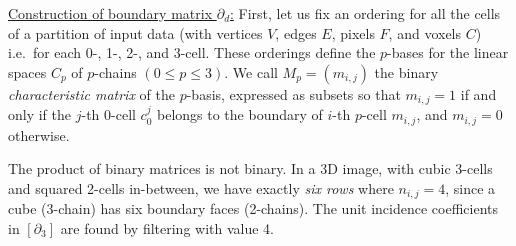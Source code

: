 \documentclass{article}
\newcommand{\B}{\mathbb{B}}
\begin{document}

\vspace{10pt}
\noindent\underline{
Construction of boundary matrix  $\partial_d$:}\vspace{0.2em}\newline 
First, let us fix an ordering for all the cells of a partition of input data (with vertices $V$, edges $E$, pixels $F$, and voxels $C$) i.e.~for each 0-, 1-, 2-, and 3-cell. These orderings define the $p$-bases for the linear spaces $C_p$ of $p$-chains $(0 \leq p \leq 3)$. 
We call $M_p=\left(m_{i,j}\right)$ the binary
\emph{characteristic matrix} of the $p$-basis, expressed as subsets so that $m_{i,j}=1$ if and only if the $j$-th  $0$-cell $c^j_0$ belongs 
to the boundary of $i$-th $p$-cell $m_{i,j}$, and $m_{i,j}=0$ otherwise. 

The product of binary matrices is not binary.
In a 3D image, with cubic 3-cells and squared 2-cells in-between, 
we 
have exactly \emph{six rows} where  $n_{i,j} = 4$, since a cube (3-chain) has six boundary faces (2-chains). The unit incidence coefficients in $\left[\partial_3\right]$ are found by filtering with value 4.
\end{document}
